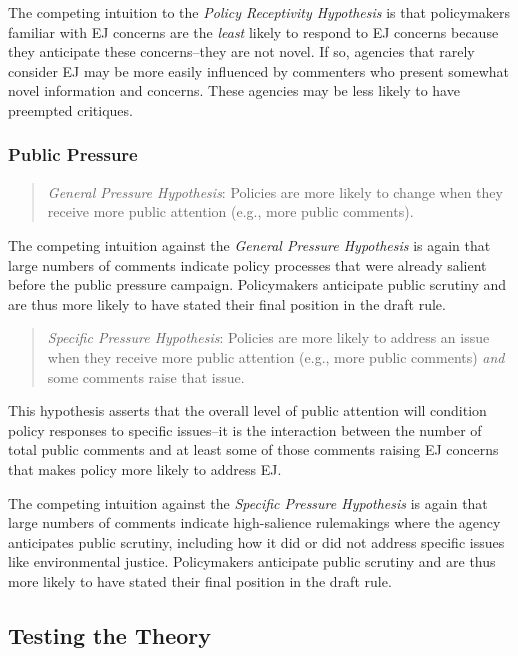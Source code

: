 \documentclass[
      12pt,
        ]{article}
\begin{document}
The competing intuition to the \emph{Policy Receptivity Hypothesis} is that policymakers familiar with EJ concerns are the \emph{least} likely to respond to EJ concerns because they anticipate these concerns--they are not novel. If so, agencies that rarely consider EJ may be more easily influenced by commenters who present somewhat novel information and concerns. These agencies may be less likely to have preempted critiques.

\hypertarget{public-pressure}{%
\subsubsection{Public Pressure}\label{public-pressure}}

\begin{quote}
\emph{General Pressure Hypothesis}: Policies are more likely to change when they receive more public attention (e.g., more public comments).
\end{quote}

The competing intuition against the \emph{General Pressure Hypothesis} is again that large numbers of comments indicate policy processes that were already salient before the public pressure campaign. Policymakers anticipate public scrutiny and are thus more likely to have stated their final position in the draft rule.

\begin{quote}
\emph{Specific Pressure Hypothesis}: Policies are more likely to address an issue when they receive more public attention (e.g., more public comments) \emph{and} some comments raise that issue.
\end{quote}

This hypothesis asserts that the overall level of public attention will condition policy responses to specific issues--it is the interaction between the number of total public comments and at least some of those comments raising EJ concerns that makes policy more likely to address EJ.

The competing intuition against the \emph{Specific Pressure Hypothesis} is again that large numbers of comments indicate high-salience rulemakings where the agency anticipates public scrutiny, including how it did or did not address specific issues like environmental justice. Policymakers anticipate public scrutiny and are thus more likely to have stated their final position in the draft rule.

\hypertarget{testing-the-theory}{%
\subsection{Testing the Theory}\label{testing-the-theory}}
\end{document}
